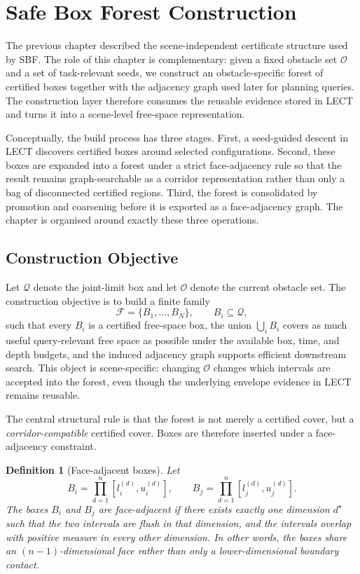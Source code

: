 \documentclass[journal]{IEEEtran}
\newtheorem{definition}{Definition}
\newcommand{\sbf}{\textsc{SBF}}
\newcommand{\calO}{\ensuremath{\mathcal{O}}}
\newcommand{\Q}{\ensuremath{\mathcal{Q}}}
\begin{document}
\section{Safe Box Forest Construction}\label{sec:forest}

The previous chapter described the scene-independent certificate structure used
by \sbf{}. The role of this chapter is complementary: given a fixed obstacle
set $\calO$ and a set of task-relevant seeds, we construct an
obstacle-specific forest of certified boxes together with the adjacency graph
used later for planning queries. The construction layer therefore consumes the
reusable evidence stored in LECT and turns it into a scene-level free-space
representation.

Conceptually, the build process has three stages. First, a seed-guided descent
in LECT discovers certified boxes around selected configurations. Second, these
boxes are expanded into a forest under a strict face-adjacency rule so that the
result remains graph-searchable as a corridor representation rather than only a
bag of disconnected certified regions. Third, the forest is consolidated by
promotion and coarsening before it is exported as a face-adjacency graph. The
chapter is organised around exactly these three operations.

\subsection{Construction Objective}\label{sec:forest_objective}

Let $\Q$ denote the joint-limit box and let $\calO$ denote the current obstacle
set. The construction objective is to build a finite family
\[
\mathcal{F} = \{B_1,\dots,B_N\}, \qquad B_i \subseteq \Q,
\]
such that every $B_i$ is a certified free-space box, the union
$\bigcup_i B_i$ covers as much useful query-relevant free space as possible
under the available box, time, and depth budgets, and the induced adjacency
graph supports efficient downstream search. This object is scene-specific:
changing $\calO$ changes which intervals are accepted into the forest, even
though the underlying envelope evidence in LECT remains reusable.

The central structural rule is that the forest is not merely a certified cover,
but a \emph{corridor-compatible} certified cover. Boxes are therefore inserted
under a face-adjacency constraint.

\begin{definition}[Face-adjacent boxes]\label{def:face_adjacent}
Let
\[
B_i = \prod_{d=1}^{n}[l_i^{(d)},u_i^{(d)}],
\qquad
B_j = \prod_{d=1}^{n}[l_j^{(d)},u_j^{(d)}].
\]
The boxes $B_i$ and $B_j$ are face-adjacent if there exists exactly one
dimension $d^\star$ such that the two intervals are flush in that dimension,
and the intervals overlap with positive measure in every other dimension. In
other words, the boxes share an $(n-1)$-dimensional face rather than only a
lower-dimensional boundary contact.
\end{definition}
\end{document}
